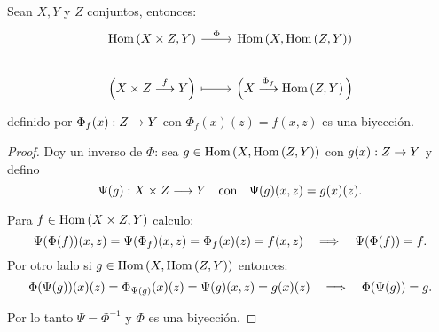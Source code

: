 
\begin{ejercicio}\label{ej:siete}
Sean $X,Y$ y $Z$ conjuntos, entonces:
\[
\begin{tikzcd}
	\Hom{X\times Z,Y} \arrow[r,"\Phi"] & \Hom{X,\Hom{Z,Y}} \\
	\Big( X\times Z \morf{f} Y \Big) \arrow[r,mapsto] & \Big( X \morf{\Phi_f} \Hom{Z,Y} \Big)
\end{tikzcd}
\]
definido por $\Phi_f(x):Z\rightarrow Y$ con $\Phi_f(x)(z)=f(x,z)$ es una biyecci\'on.
\end{ejercicio}

\begin{proof}%

Doy un inverso de $\Phi$: sea $g\in\text{Hom}\left( X,\text{Hom}\left( Z,Y \right) \right)$ con $g(x):Z\rightarrow Y$ y defino
\[
	\Psi(g):X\times Z \longrightarrow Y \quad\text{con}\quad \Psi(g)(x,z)=g(x)(z).
\]

Para $f\in\text{Hom}\left( X\times Z,Y \right)$ calculo:
\[
	\Psi(\Phi(f))(x,z)=\Psi(\Phi_f)(x,z)=\Phi_f(x)(z)=f(x,z) \quad\Longrightarrow\quad
	\Psi(\Phi(f))=f.
\]
Por otro lado si $g\in\text{Hom}\left( X,\text{Hom}\left( Z,Y \right) \right)$ entonces:
\[
	\Phi(\Psi(g))(x)(z)=\Phi_{\Psi(g)}(x)(z)=\Psi(g)(x,z)=g(x)(z) \quad\Longrightarrow\quad
	\Phi(\Psi(g))=g.
\]

Por lo tanto $\Psi=\Phi^{-1}$ y $\Phi$ es una biyecci\'on.

\end{proof}%

